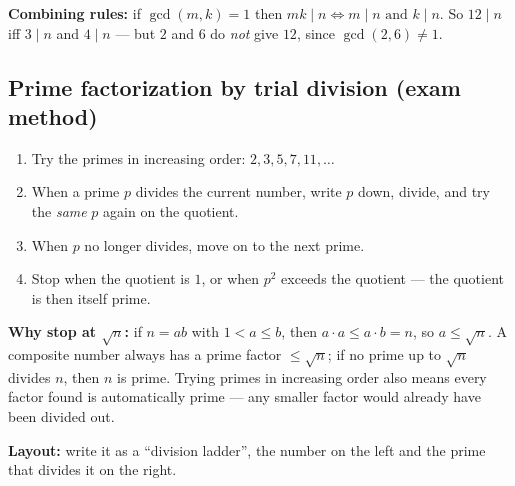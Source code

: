 \documentclass{fkt-notes}
\theoremstyle{definition}
\begin{document}
\begin{rulepar}
  \noindent \textbf{Combining rules:} if $\gcd(m, k) = 1$ then
  $mk \mid n \iff m \mid n \text{ and } k \mid n$. So $12 \mid n$ iff
  $3 \mid n$ and $4 \mid n$ --- but $2$ and $6$ do \emph{not} give $12$,
  since $\gcd(2, 6) \neq 1$.
\end{rulepar}

\subsection{Prime factorization by trial division (exam method)}
\begin{enumerate}[label=\arabic*.]
  \item Try the primes in increasing order: $2, 3, 5, 7, 11, \ldots$
  \item When a prime $p$ divides the current number, write $p$ down,
        divide, and try the \emph{same} $p$ again on the quotient.
  \item When $p$ no longer divides, move on to the next prime.
  \item Stop when the quotient is $1$, or when $p^2$ exceeds the
        quotient --- the quotient is then itself prime.
\end{enumerate}

\noindent \textbf{Why stop at $\sqrt{n}$:} if $n = ab$ with
$1 < a \leq b$, then $a \cdot a \leq a \cdot b = n$, so $a \leq \sqrt{n}$.
A composite number always has a prime factor $\leq \sqrt{n}$; if no
prime up to $\sqrt{n}$ divides $n$, then $n$ is prime. Trying primes
in increasing order also means every factor found is automatically
prime --- any smaller factor would already have been divided out.

\noindent \textbf{Layout:} write it as a ``division ladder'', the number
on the left and the prime that divides it on the right.
\end{document}
